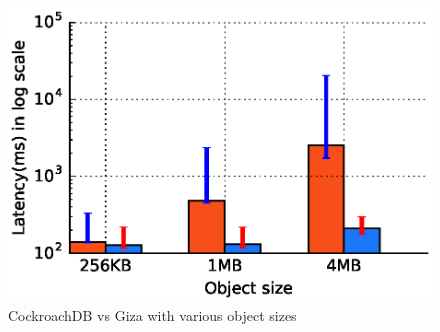 
\begin{figure}[t]
      \includegraphics[width=\linewidth]{plots/giza_cock_put}
      \caption{CockroachDB vs Giza with various object sizes}
      \label{fig:eval_cock_put}
\end{figure}


